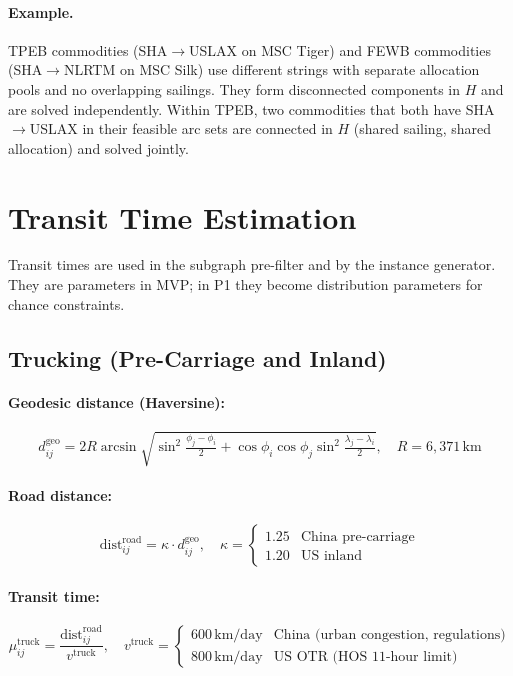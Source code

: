 \documentclass[11pt,a4paper]{article}
\theoremstyle{definition}
\begin{document}
\paragraph{Example.} TPEB commodities (SHA$\to$USLAX on MSC Tiger) and FEWB commodities
(SHA$\to$NLRTM on MSC Silk) use different strings with separate allocation pools and no
overlapping sailings. They form disconnected components in $H$ and are solved independently.
Within TPEB, two commodities that both have SHA$\to$USLAX in their feasible arc sets are
connected in $H$ (shared sailing, shared allocation) and solved jointly.

\section{Transit Time Estimation}
\label{sec:transit}

Transit times are used in the subgraph pre-filter and by the instance generator. They are
parameters in MVP; in P1 they become distribution parameters for chance constraints.

\subsection{Trucking (Pre-Carriage and Inland)}

\paragraph{Geodesic distance (Haversine):}
\[
  d_{ij}^{\text{geo}} = 2R \arcsin\!\sqrt{
    \sin^2\tfrac{\phi_j - \phi_i}{2}
    + \cos\phi_i \cos\phi_j \sin^2\tfrac{\lambda_j - \lambda_i}{2}
  }, \quad R = 6{,}371\,\text{km}
\]

\paragraph{Road distance:}
\[
  \text{dist}_{ij}^{\text{road}} = \kappa \cdot d_{ij}^{\text{geo}}, \quad
  \kappa = \begin{cases}
    1.25 & \text{China pre-carriage} \\
    1.20 & \text{US inland}
  \end{cases}
\]

\paragraph{Transit time:}
\[
  \mu_{ij}^{\text{truck}} = \frac{\text{dist}_{ij}^{\text{road}}}{v^{\text{truck}}}, \quad
  v^{\text{truck}} = \begin{cases}
    600\,\text{km/day} & \text{China (urban congestion, regulations)} \\
    800\,\text{km/day} & \text{US OTR (HOS 11-hour limit)}
  \end{cases}
\]
\end{document}

